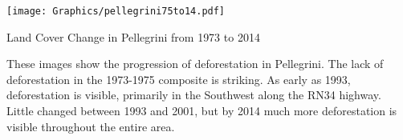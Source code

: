 \begin{ssfigure}
  \centering
  \texttt{[image: Graphics/pellegrini75to14.pdf]}
  \caption{Land Cover Change in Pellegrini from 1973 to 2014}
  \label{map:pellegriniCoverChange}
  \medskip
  \small
  These images show the progression of deforestation in Pellegrini. The lack of deforestation in the 1973-1975 composite is striking. As early as 1993, deforestation is visible, primarily in the Southwest along the RN34 highway. Little changed between 1993 and 2001, but by 2014 much more deforestation is visible throughout the entire area.\end{ssfigure}

